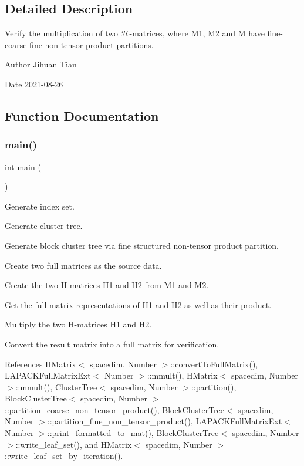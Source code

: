 \subsection{Detailed Description}
Verify the multiplication of two $\mathcal{H}$-\/matrices, where M1, M2 and M have fine-\/coarse-\/fine non-\/tensor product partitions. 

\begin{DoxyAuthor}{Author}
Jihuan Tian 
\end{DoxyAuthor}
\begin{DoxyDate}{Date}
2021-\/08-\/26 
\end{DoxyDate}


\subsection{Function Documentation}
\mbox{\label{hmatrix-hmatrix-mmult-fine-coarse-fine-ntp_8cc_ae66f6b31b5ad750f1fe042a706a4e3d4}} 
\subsubsection{\texorpdfstring{main()}{main()}}
{\footnotesize\ttfamily int main (\begin{DoxyParamCaption}{ }\end{DoxyParamCaption})}

Generate index set.

Generate cluster tree.

Generate block cluster tree via fine structured non-\/tensor product partition.

Create two full matrices as the source data.

Create the two H-\/matrices {\ttfamily H1} and {\ttfamily H2} from {\ttfamily M1} and {\ttfamily M2}.

Get the full matrix representations of {\ttfamily H1} and {\ttfamily H2} as well as their product.

Multiply the two H-\/matrices {\ttfamily H1} and {\ttfamily H2}.

Convert the result matrix into a full matrix for verification.

References H\+Matrix$<$ spacedim, Number $>$\+::convert\+To\+Full\+Matrix(), L\+A\+P\+A\+C\+K\+Full\+Matrix\+Ext$<$ Number $>$\+::mmult(), H\+Matrix$<$ spacedim, Number $>$\+::mmult(), Cluster\+Tree$<$ spacedim, Number $>$\+::partition(), Block\+Cluster\+Tree$<$ spacedim, Number $>$\+::partition\+\_\+coarse\+\_\+non\+\_\+tensor\+\_\+product(), Block\+Cluster\+Tree$<$ spacedim, Number $>$\+::partition\+\_\+fine\+\_\+non\+\_\+tensor\+\_\+product(), L\+A\+P\+A\+C\+K\+Full\+Matrix\+Ext$<$ Number $>$\+::print\+\_\+formatted\+\_\+to\+\_\+mat(), Block\+Cluster\+Tree$<$ spacedim, Number $>$\+::write\+\_\+leaf\+\_\+set(), and H\+Matrix$<$ spacedim, Number $>$\+::write\+\_\+leaf\+\_\+set\+\_\+by\+\_\+iteration().

